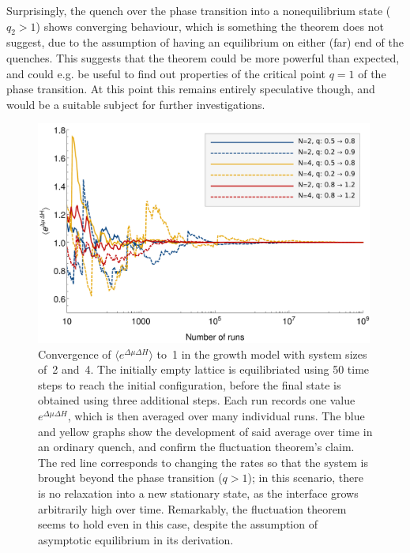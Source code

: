 Surprisingly, the quench over the phase transition into a nonequilibrium state (\(q_2 > 1\)) shows converging behaviour, which is something the theorem does not suggest, due to the assumption of having an equilibrium on either (far) end of the quenches. This suggests that the theorem could be more powerful than expected, and could e.g. be useful to find out properties of the critical point \(q = 1\) of the phase transition. At this point this remains entirely speculative though, and would be a suitable subject for further investigations.




\begin{figure}[htbp]
	\centering
	\includegraphics[width=30em]{figures/growth_process}
	\caption[]{Convergence of \(\langle e^{\Delta\mu\Delta H}\rangle\) to~1 in the growth model with system sizes of~{\color{blue}2} and~{\color{dyellow}4}. The initially empty lattice is equilibriated using 50 time steps to reach the initial configuration, before the final state is obtained using three additional steps. Each run records one value \(e^{\Delta\mu\Delta H}\), which is then averaged over many individual runs. The {\color{blue}blue} and {\color{dyellow}yellow} graphs show the development of said average over time in an ordinary quench, and confirm the fluctuation theorem's claim. The {\color{red}red} line corresponds to changing the rates so that the system is brought beyond the phase transition (\(q > 1\)); in this scenario, there is no relaxation into a new stationary state, as the interface grows arbitrarily high over time. Remarkably, the fluctuation theorem seems to hold even in this case, despite the assumption of asymptotic equilibrium in its derivation.}
	\label{fig:growth_process_plot}
\end{figure}




